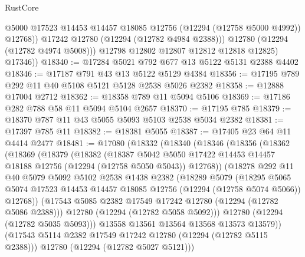 \begin{lexlean}{RustCore}
\begin{coremodule}
                  @5000
                  @17523
                  @14453
                  @14457
                  @18085
                  @12756
                  (@12294 (@12758 @5000 @4992))
                  @12768))
              @17242
              @12780
              (@12294 (@12782 @4984 @2388)))
            @12780
            (@12294 (@12782 @4974 @5008)))
          @12798
          @12802
          @12807
          @12812
          @12818
          @12825)
        @17346))
@18340 := @17284 @5021 @792 @677 @13 @5122 @5131 @2388 @4402
@18346 := @17187 @791 @43 @13 @5122 @5129 @4384
@18356 := @17195 @789 @292 @11 @40 @5108 @5121 @5128 @2538 @5026 @2382
@18358 := @12888 @17004 @2712
@18362 := @18358 @789 @11 @5094 @5106
@18369 := @17186 @282 @788 @58 @11 @5094 @5104 @2657
@18370 := @17195 @785
@18379 := @18370 @787 @11 @43 @5055 @5093 @5103 @2538 @5034 @2382
@18381 := @17397 @785 @11
@18382 := @18381 @5055
@18387 := @17405 @23 @64 @11 @4414 @2477
@18481 := @17080
    (@18332
      (@18340
        (@18346
          (@18356
            (@18362
              (@18369
                (@18379
                  (@18382
                    (@18387
                      @5042
                      @5050
                      @17422
                      @14453
                      @14457
                      @18188
                      @12756
                      (@12294 (@12758 @5050 @5043))
                      @12768))
                  (@18278
                    @292
                    @11
                    @40
                    @5079
                    @5092
                    @5102
                    @2538
                    @1438
                    @2382
                    (@18289
                      @5079
                      (@18295
                        @5065
                        @5074
                        @17523
                        @14453
                        @14457
                        @18085
                        @12756
                        (@12294 (@12758 @5074 @5066))
                        @12768))
                    (@17543 @5085 @2382 @17549 @17242 @12780 (@12294 (@12782 @5086 @2388)))
                    @12780
                    (@12294 (@12782 @5058 @5092)))
                  @12780
                  (@12294 (@12782 @5035 @5093)))
                @13558
                @13561
                @13564
                @13568
                @13573
                @13579))
            (@17543 @5114 @2382 @17549 @17242 @12780 (@12294 (@12782 @5115 @2388)))
            @12780
            (@12294 (@12782 @5027 @5121)))

\end{coremodule}
\end{lexlean}
